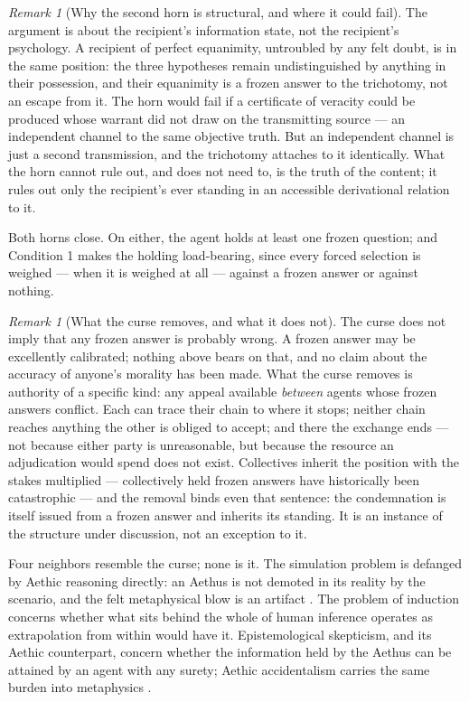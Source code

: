 \documentclass[11pt]{article}
\numberwithin{equation}{section}
\theoremstyle{plain}
\theoremstyle{definition}
\theoremstyle{remark}
\newtheorem{remark}[theorem]{Remark}
\begin{document}
\begin{remark}[Why the second horn is structural, and where it could fail]\label{ac:rem:structural}
The argument is about the recipient's information state, not the recipient's psychology. A recipient of perfect equanimity, untroubled by any felt doubt, is in the same position: the three hypotheses remain undistinguished by anything in their possession, and their equanimity is a frozen answer to the trichotomy, not an escape from it. The horn would fail if a certificate of veracity could be produced whose warrant did not draw on the transmitting source --- an independent channel to the same objective truth. But an independent channel is just a second transmission, and the trichotomy attaches to it identically. What the horn cannot rule out, and does not need to, is the truth of the content; it rules out only the recipient's ever standing in an accessible derivational relation to it.
\end{remark}

Both horns close. On either, the agent holds at least one frozen question; and Condition 1 makes the holding load-bearing, since every forced selection is weighed --- when it is weighed at all --- against a frozen answer or against nothing.

\begin{remark}[What the curse removes, and what it does not]\label{ac:rem:authority}
The curse does not imply that any frozen answer is probably wrong. A frozen answer may be excellently calibrated; nothing above bears on that, and no claim about the accuracy of anyone's morality has been made. What the curse removes is authority of a specific kind: any appeal available \emph{between} agents whose frozen answers conflict. Each can trace their chain to where it stops; neither chain reaches anything the other is obliged to accept; and there the exchange ends --- not because either party is unreasonable, but because the resource an adjudication would spend does not exist. Collectives inherit the position with the stakes multiplied --- collectively held frozen answers have historically been catastrophic --- and the removal binds even that sentence: the condemnation is itself issued from a frozen answer and inherits its standing. It is an instance of the structure under discussion, not an exception to it.
\end{remark}

Four neighbors resemble the curse; none is it. The simulation problem is defanged by Aethic reasoning directly: an Aethus is not demoted in its reality by the scenario, and the felt metaphysical blow is an artifact \cite{Aethus}. The problem of induction concerns whether what sits behind the whole of human inference operates as extrapolation from within would have it. Epistemological skepticism, and its Aethic counterpart, concern whether the information held by the Aethus can be attained by an agent with any surety; Aethic accidentalism carries the same burden into metaphysics \cite{Aethus}.
\end{document}
